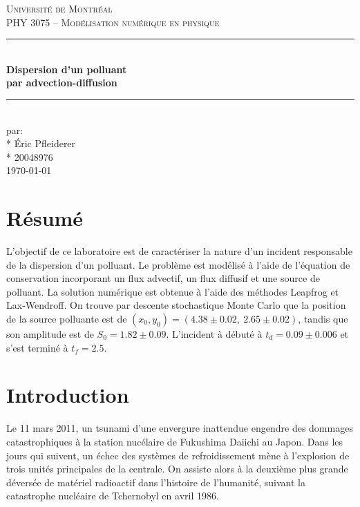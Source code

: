 \documentclass{article}
\begin{document}
\begin{titlepage}
\center
\vspace*{2cm}
\textsc{\LARGE Université de Montréal}\\[1cm] 
\textsc{\Large PHY 3075 -- Modélisation numérique en physique}\\[4cm] %
\rule{\linewidth}{0.5mm} \\[0.5cm]
{\LARGE \bfseries Dispersion d'un polluant} \\[0.2cm] %
{\LARGE \bfseries par advection-diffusion} \\[0.2cm]
\rule{\linewidth}{0.5mm} \\[4cm]
\large par: \\*
    Éric Pfleiderer \\* 
    20048976\\[4cm] 
{\large \today}\\[3cm]
\vfill
\end{titlepage}

\section*{Résumé}
L'objectif de ce laboratoire est de caractériser la nature d'un incident responsable de la dispersion d'un polluant. Le problème est modélisé à l'aide de l'équation de conservation incorporant un flux advectif, un flux diffusif et une source de polluant. La solution numérique est obtenue à l'aide des méthodes Leapfrog et Lax-Wendroff. On trouve par descente stochastique Monte Carlo que la position de la source polluante est de $(x_0, y_0) = (4.38\pm0.02,\ 2.65\pm0.02)$, tandis que son amplitude est de $S_0 = 1.82 \pm 0.09$. L'incident à débuté à $t_d = 0.09 \pm 0.006$ et s'est terminé à $t_f = 2.5$.

\section*{Introduction}

Le 11 mars 2011, un tsunami d'une envergure inattendue engendre des dommages catastrophiques à la station nucélaire de Fukushima Daiichi au Japon. Dans les jours qui suivent, un échec des systèmes de refroidissement mène à l'explosion de trois unités principales de la centrale. On assiste alors à la deuxième plus grande déversée de matériel radioactif dans l'histoire de l'humanité, suivant la catastrophe nucléaire de Tchernobyl en avril 1986.
\end{document}
